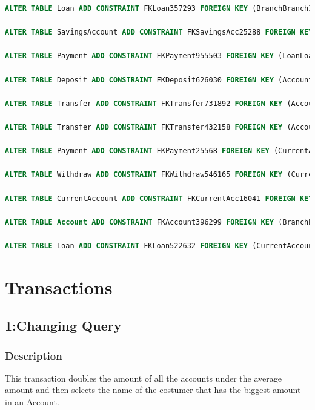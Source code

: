 \documentclass[a4paper, 10pt]{article}
\begin{document}
\begin{lstlisting}[language=SQL]
ALTER TABLE Loan ADD CONSTRAINT FKLoan357293 FOREIGN KEY (BranchBranchId) REFERENCES Branch (BranchId);

ALTER TABLE SavingsAccount ADD CONSTRAINT FKSavingsAcc25288 FOREIGN KEY (AccountAccountID) REFERENCES Account (AccountID);

ALTER TABLE Payment ADD CONSTRAINT FKPayment955503 FOREIGN KEY (LoanLoanID) REFERENCES Loan (LoanID);

ALTER TABLE Deposit ADD CONSTRAINT FKDeposit626030 FOREIGN KEY (AccountAccountID) REFERENCES Account (AccountID);

ALTER TABLE Transfer ADD CONSTRAINT FKTransfer731892 FOREIGN KEY (AccountAccountIDFrom) REFERENCES Account (AccountID);

ALTER TABLE Transfer ADD CONSTRAINT FKTransfer432158 FOREIGN KEY (AccountAccountIDTo) REFERENCES Account (AccountID);

ALTER TABLE Payment ADD CONSTRAINT FKPayment25568 FOREIGN KEY (CurrentAccountAccountID) REFERENCES CurrentAccount (AccountAccountID);

ALTER TABLE Withdraw ADD CONSTRAINT FKWithdraw546165 FOREIGN KEY (CurrentAccountAccountID) REFERENCES CurrentAccount (AccountAccountID);

ALTER TABLE CurrentAccount ADD CONSTRAINT FKCurrentAcc16041 FOREIGN KEY (AccountAccountID) REFERENCES Account (AccountID);

ALTER TABLE Account ADD CONSTRAINT FKAccount396299 FOREIGN KEY (BranchBranchId) REFERENCES Branch (BranchId);

ALTER TABLE Loan ADD CONSTRAINT FKLoan522632 FOREIGN KEY (CurrentAccountAccountAccountID) REFERENCES CurrentAccount (AccountAccountID);
\end{lstlisting}

\section{Transactions}

\subsection{1:Changing Query}
\subsubsection{Description}
This transaction doubles the amount of all the accounts under the average amount and then selects the name of the costumer that has the biggest amount in an Account.
\end{document}
